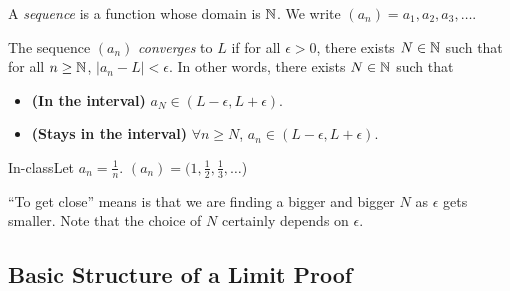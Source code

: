 \begin{definition}
    A \textit{sequence} is a function whose domain is \(\mathbb{N}\). We write \((a_n) = a_1,a_2,a_3,\dots\).
\end{definition}
\setcounter{BoxCounter}{2}
\begin{definition}
    The sequence \((a_n)\) \textit{converges} to \(L\) if for all \(\epsilon > 0\), there exists \(N \in \mathbb{N}\) such that for all \(n \geq \mathbb{N}\), \(|a_n - L| < \epsilon\). In other words, there exists \(N \in \mathbb{N}\) such that
    \begin{itemize}
        \item \textbf{(In the interval)} \(a_N \in (L - \epsilon, L + \epsilon)\).
        \item \textbf{(Stays in the interval)} \(\forall n \geq N\), \(a_n \in (L - \epsilon, L + \epsilon)\).
    \end{itemize}
\end{definition}

\begin{example}
    {In-class}Let \(a_n = \frac{1}{n}\). \((a_n) = (1,\frac{1}{2},\frac{1}{3},\dots\))
\end{example}


``To get close'' means is that we are finding a bigger and bigger \(N\) as \(\epsilon\) gets smaller. Note that the choice of \(N\) certainly depends on \(\epsilon\).

\subsection{Basic Structure of a Limit Proof}

